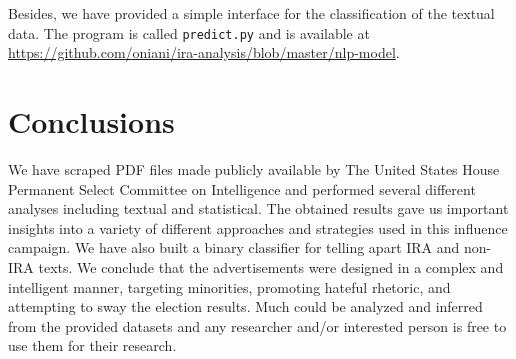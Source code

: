 \documentclass{article}
\begin{document}
Besides, we have provided a simple interface for the classification of the
textual data. The program is called \texttt{predict.py} and is available at
\url{https://github.com/oniani/ira-analysis/blob/master/nlp-model}.


\section{Conclusions}

We have scraped PDF files made publicly available by The United States House
Permanent Select Committee on Intelligence and performed several different
analyses including textual and statistical. The obtained results gave us
important insights into a variety of different approaches and strategies used
in this influence campaign. We have also built a binary classifier for telling
apart IRA and non-IRA texts. We conclude that the advertisements were designed
in a complex and intelligent manner, targeting minorities, promoting hateful
rhetoric, and attempting to sway the election results. Much could be analyzed
and inferred from the provided datasets and any researcher and/or interested
person is free to use them for their research.


\printbibliography

\end{document}
